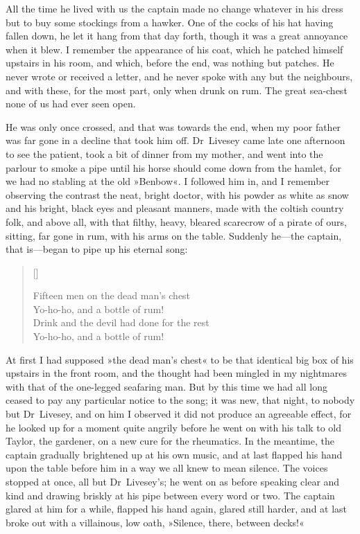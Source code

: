 All the time he lived with us the captain made no change what\-ever in his dress but to buy some stockings from a hawker. One of the cocks of his hat having fallen down, he let it hang from that day forth, though it was a great annoyance when it blew. I remember the appearance of his coat, which he patched himself upstairs in his room, and which, before the end, was nothing but patches. He never wrote or received a letter, and he never spoke with any but the neighbours, and with these, for the most part, only when drunk on rum. The great sea-chest none of us had ever seen open.

He was only once crossed, and that was towards the end, when my poor father was far gone in a decline that took him off. Dr~Livesey came late one afternoon to see the patient, took a bit of dinner from my mother, and went into the parlour to smoke a pipe until his horse should come down from the hamlet, for we had no stabling at the old »Benbow«. I followed him in, and I remember observing the contrast the neat, bright doctor, with his powder as white as snow and his bright, black eyes and pleasant manners, made with the coltish country folk, and above all, with that filthy, heavy, bleared scarecrow of a pirate of ours, sitting, far gone in rum, with his arms on the table. Suddenly he—the captain, that is—began to pipe up his eternal song:

\settowidth{\versewidth}{Drink and the devil had done for the rest\longdash}
\begin{verse}[\versewidth]
\begin{altverse}
Fifteen men on the dead man’s chest\longdash\\
Yo-ho-ho, and a bottle of rum!\\
Drink and the devil had done for the rest\longdash\\
Yo-ho-ho, and a bottle of rum!
\end{altverse}
\end{verse}

At first I had supposed »the dead man's chest« to be that identical big box of his upstairs in the front room, and the thought had been mingled in my nightmares with that of the one-legged seafaring man. But by this time we had all long ceased to pay any particular notice to the song; it was new, that night, to nobody but Dr~Livesey, and on him I observed it did not produce an agreeable effect, for he looked up for a moment quite angrily before he went on with his talk to old Taylor, the gardener, on a new cure for the rheumatics. In the meantime, the captain gradually brightened up at his own music, and at last flapped his hand upon the table before him in a way we all knew to mean silence. The voices stopped at once, all but Dr~Livesey's; he went on as before speaking clear and kind and drawing briskly at his pipe between every word or two. The captain glared at him for a while, flapped his hand again, glared still harder, and at last broke out with a villainous, low oath, »Silence, there, between decks!«

